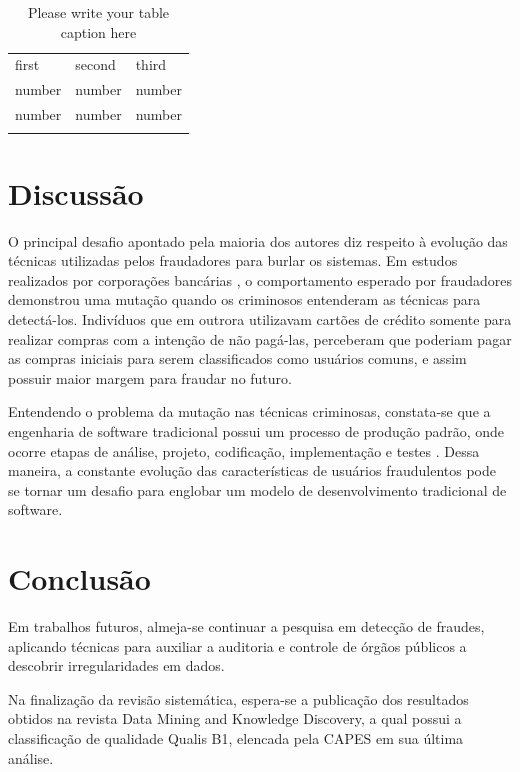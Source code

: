 \documentclass[smallextended]{svjour3}
\begin{document}
\begin{table}
	\caption{Please write your table caption here}
	\label{tab:1}       %
	\begin{tabular}{lll}
		\hline\noalign{\smallskip}
		first & second & third  \\
		\noalign{\smallskip}\hline\noalign{\smallskip}
		number & number & number \\
		number & number & number \\
		\noalign{\smallskip}\hline
	\end{tabular}
\end{table}

\section{Discussão}
\label{sec:5}

O principal desafio apontado pela maioria dos autores diz respeito à evolução das técnicas utilizadas pelos fraudadores para burlar os sistemas. Em estudos realizados por corporações bancárias \cite{Bolton2002}, o comportamento esperado por fraudadores demonstrou uma mutação quando os criminosos entenderam as técnicas para detectá-los. Indivíduos que em outrora utilizavam cartões de crédito somente para realizar compras com a intenção de não pagá-las, perceberam que poderiam pagar as compras iniciais para serem classificados como usuários comuns, e assim possuir maior margem para fraudar no futuro.

Entendendo o problema da mutação nas técnicas criminosas, constata-se que a engenharia de software tradicional possui um processo de produção padrão, onde ocorre etapas de análise, projeto, codificação, implementação e testes \cite{sommervillesoftware}. Dessa maneira, a constante evolução das características de usuários fraudulentos pode se tornar um desafio para englobar um modelo de desenvolvimento tradicional de software. 

\section{Conclusão}
\label{sec:6}

Em trabalhos futuros, almeja-se continuar a pesquisa em detecção de fraudes, aplicando técnicas para auxiliar a auditoria e controle de órgãos públicos a descobrir irregularidades em dados.

Na finalização da revisão sistemática, espera-se a publicação dos resultados obtidos na revista Data Mining and Knowledge Discovery, a qual possui a classificação de qualidade Qualis B1, elencada pela CAPES em sua última análise. 
\end{document}
